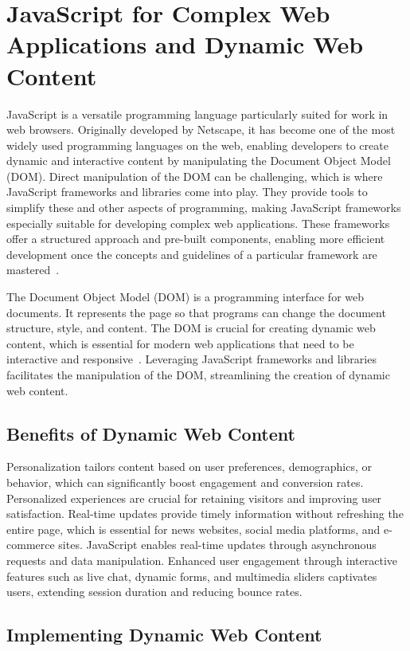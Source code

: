 \section{JavaScript for Complex Web Applications and Dynamic Web Content}

JavaScript is a versatile programming language particularly suited for work in web browsers. Originally developed by Netscape, it has become one of the most widely used programming languages on the web, enabling developers to create dynamic and interactive content by manipulating the Document Object Model (DOM). Direct manipulation of the DOM can be challenging, which is where JavaScript frameworks and libraries come into play. They provide tools to simplify these and other aspects of programming, making JavaScript frameworks especially suitable for developing complex web applications. These frameworks offer a structured approach and pre-built components, enabling more efficient development once the concepts and guidelines of a particular framework are mastered~\cite{ionos_jsframeworks}.

The Document Object Model (DOM) is a programming interface for web documents. It represents the page so that programs can change the document structure, style, and content. The DOM is crucial for creating dynamic web content, which is essential for modern web applications that need to be interactive and responsive~\cite{mdn_dom}. Leveraging JavaScript frameworks and libraries facilitates the manipulation of the DOM, streamlining the creation of dynamic web content.

\subsection{Benefits of Dynamic Web Content}

Personalization tailors content based on user preferences, demographics, or behavior, which can significantly boost engagement and conversion rates. Personalized experiences are crucial for retaining visitors and improving user satisfaction. Real-time updates provide timely information without refreshing the entire page, which is essential for news websites, social media platforms, and e-commerce sites. JavaScript enables real-time updates through asynchronous requests and data manipulation. Enhanced user engagement through interactive features such as live chat, dynamic forms, and multimedia sliders captivates users, extending session duration and reducing bounce rates.

\subsection{Implementing Dynamic Web Content}

